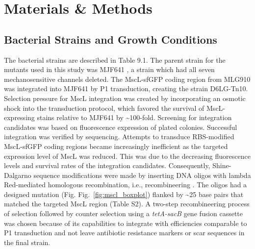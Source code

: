 \documentclass[12pt]{caltech_thesis}
\begin{document}
\hypertarget{materials-methods-3}{%
\section{Materials \& Methods}\label{materials-methods-3}}

\hypertarget{bacterial-strains-and-growth-conditions}{%
\subsection{Bacterial Strains and Growth
Conditions}\label{bacterial-strains-and-growth-conditions}}

The bacterial strains are described in Table 9.1. The parent strain for
the mutants used in this study was MJF641 \autocite{edwards2012}, a
strain which had all seven mechanosensitive channels deleted. The
MscL-sfGFP coding region from MLG910 \autocite{bialecka-fornal2012} was
integrated into MJF641 by P1 transduction, creating the strain
D6LG-Tn10. Selection pressure for MscL integration was created by
incorporating an osmotic shock into the transduction protocol, which
favored the survival of MscL-expressing stains relative to MJF641 by
\textasciitilde100-fold. Screening for integration candidates was based
on fluorescence expression of plated colonies. Successful integration
was verified by sequencing. Attempts to transduce RBS-modified
MscL-sfGFP coding regions became increasingly inefficient as the
targeted expression level of MscL was reduced. This was due to the
decreasing fluorescence levels and survival rates of the integration
candidates. Consequently, Shine-Dalgarno sequence modifications were
made by inserting DNA oligos with lambda Red-mediated homologous
recombination, i.e., recombineering \autocite{sharan2009}. The oligos
had a designed mutation (Fig. Fig.~\ref{fig:mscl_boxplot}) flanked by
\textasciitilde25 base pairs that matched the targeted MscL region
(Table S2). A two-step recombineering process of selection followed by
counter selection using a \emph{tetA-sacB} gene fusion cassette
\autocite{li2013} was chosen because of its capabilities to integrate
with efficiencies comparable to P1 transduction and not leave antibiotic
resistance markers or scar sequences in the final strain.
\end{document}
